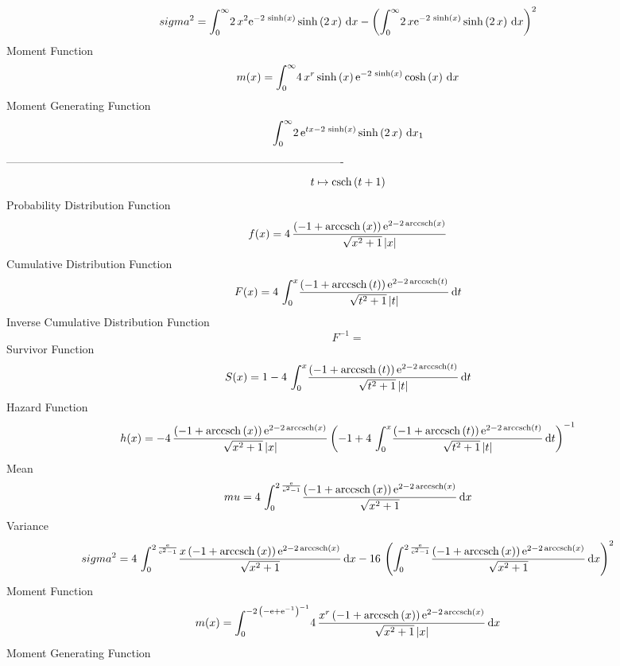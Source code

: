 \documentclass[12pt]{article}
\begin{document}
 $$ sigma^2 = \int_{0}^{\infty }\!2\,{x}^{2}{{\rm e}^{-2\,\sinh \left( x \right) }}
\sinh \left( 2\,x \right) \,{\rm d}x- \left( \int_{0}^{\infty }\!2\,x{
{\rm e}^{-2\,\sinh \left( x \right) }}\sinh \left( 2\,x \right) 
\,{\rm d}x \right) ^{2}
$$Moment Function 
 $$ m(x) = \int_{0}^{\infty }\!4\,{x}^{r}\sinh \left( x \right) {{\rm e}^{-2\,
\sinh \left( x \right) }}\cosh \left( x \right) \,{\rm d}x
$$ Moment Generating Function 
 $$\int_{0}^{\infty }\!2\,{{\rm e}^{tx-2\,\sinh \left( x \right) }}\sinh
 \left( 2\,x \right) \,{\rm d}x_{{1}}
$$-------------------------------------------------------------------------------------------  \\$$t\mapsto {\rm csch} \left(t+1\right)
$$Probability Distribution Function 
$$  f(x)=4\,{\frac { \left( -1+{\rm arccsch} \left(x\right) \right) {{\rm e}^{2
-2\,{\rm arccsch} \left(x\right)}}}{\sqrt {{x}^{2}+1} \left| x
 \right| }}
$$Cumulative Distribution Function  
 $$F(x)=4\,\int_{0}^{x}\!{\frac { \left( -1+{\rm arccsch} \left(t\right)
 \right) {{\rm e}^{2-2\,{\rm arccsch} \left(t\right)}}}{\sqrt {{t}^{2}
+1} \left| t \right| }}\,{\rm d}t
$$ Inverse Cumulative Distribution Function 
  $$F^{-1} = $$Survivor Function 
 $$ S(x)=1-4\,\int_{0}^{x}\!{\frac { \left( -1+{\rm arccsch} \left(t\right)
 \right) {{\rm e}^{2-2\,{\rm arccsch} \left(t\right)}}}{\sqrt {{t}^{2}
+1} \left| t \right| }}\,{\rm d}t
$$ Hazard Function 
 $$ h(x)=-4\,{\frac { \left( -1+{\rm arccsch} \left(x\right) \right) {{\rm e}^{
2-2\,{\rm arccsch} \left(x\right)}}}{\sqrt {{x}^{2}+1} \left| x
 \right| } \left( -1+4\,\int_{0}^{x}\!{\frac { \left( -1+{\rm arccsch}
 \left(t\right) \right) {{\rm e}^{2-2\,{\rm arccsch} \left(t\right)}}
}{\sqrt {{t}^{2}+1} \left| t \right| }}\,{\rm d}t \right) ^{-1}}
$$Mean 
 $$ mu=4\,\int_{0}^{2\,{\frac {{\rm e}}{{{\rm e}^{2}}-1}}}\!{\frac { \left( -
1+{\rm arccsch} \left(x\right) \right) {{\rm e}^{2-2\,{\rm arccsch} 
\left(x\right)}}}{\sqrt {{x}^{2}+1}}}\,{\rm d}x
$$ Variance 
 $$ sigma^2 = 4\,\int_{0}^{2\,{\frac {{\rm e}}{{{\rm e}^{2}}-1}}}\!{\frac {x \left( 
-1+{\rm arccsch} \left(x\right) \right) {{\rm e}^{2-2\,{\rm arccsch} 
\left(x\right)}}}{\sqrt {{x}^{2}+1}}}\,{\rm d}x-16\, \left( \int_{0}^{
2\,{\frac {{\rm e}}{{{\rm e}^{2}}-1}}}\!{\frac { \left( -1+
{\rm arccsch} \left(x\right) \right) {{\rm e}^{2-2\,{\rm arccsch} 
\left(x\right)}}}{\sqrt {{x}^{2}+1}}}\,{\rm d}x \right) ^{2}
$$Moment Function 
 $$ m(x) = \int_{0}^{-2\, \left( -{\rm e}+{{\rm e}^{-1}} \right) ^{-1}}\!4\,{
\frac {{x}^{r} \left( -1+{\rm arccsch} \left(x\right) \right) {{\rm e}
^{2-2\,{\rm arccsch} \left(x\right)}}}{\sqrt {{x}^{2}+1} \left| x
 \right| }}\,{\rm d}x
$$ Moment Generating Function 
\end{document}
